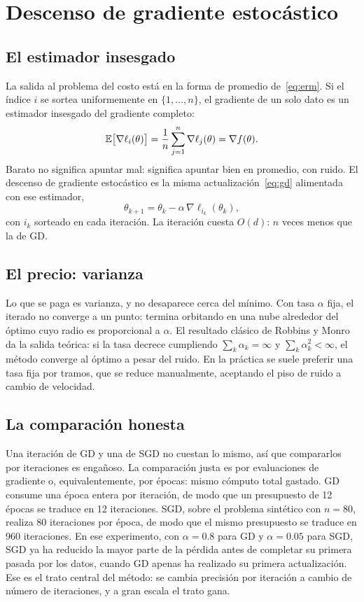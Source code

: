 \section{Descenso de gradiente estocástico}\label{sec:sgd}

\subsection{El estimador insesgado}

La salida al problema del costo está en la forma de promedio de~\eqref{eq:erm}. Si el índice $i$ se sortea uniformemente en $\{1, \dots, n\}$, el gradiente de un solo dato es un estimador insesgado del gradiente completo:
\begin{equation}
  \mathbb{E}\bigl[\nabla\ell_i(\theta)\bigr] = \frac{1}{n}\sum_{j=1}^{n} \nabla\ell_j(\theta) = \nabla f(\theta).
  \label{eq:insesgado}
\end{equation}
Barato no significa apuntar mal: significa apuntar bien en promedio, con ruido. El descenso de gradiente estocástico es la misma actualización~\eqref{eq:gd} alimentada con ese estimador,
\begin{equation}
  \theta_{k+1} = \theta_k - \alpha\,\nabla\ell_{i_k}(\theta_k),
  \label{eq:sgd}
\end{equation}
con $i_k$ sorteado en cada iteración. La iteración cuesta $O(d)$: $n$ veces menos que la de GD.

\subsection{El precio: varianza}

Lo que se paga es varianza, y no desaparece cerca del mínimo. Con tasa $\alpha$ fija, el iterado no converge a un punto: termina orbitando en una nube alrededor del óptimo cuyo radio es proporcional a $\alpha$. El resultado clásico de Robbins y Monro~\cite{robbins1951} da la salida teórica: si la tasa decrece cumpliendo $\sum_k \alpha_k = \infty$ y $\sum_k \alpha_k^2 < \infty$, el método converge al óptimo a pesar del ruido. En la práctica se suele preferir una tasa fija por tramos, que se reduce manualmente, aceptando el piso de ruido a cambio de velocidad.

\subsection{La comparación honesta}

Una iteración de GD y una de SGD no cuestan lo mismo, así que compararlos por iteraciones es engañoso. La comparación justa es por evaluaciones de gradiente o, equivalentemente, por épocas: mismo cómputo total gastado. GD consume una época entera por iteración, de modo que un presupuesto de 12 épocas se traduce en 12 iteraciones. SGD, sobre el problema sintético con $n = 80$, realiza 80 iteraciones por época, de modo que el mismo presupuesto se traduce en 960 iteraciones. En ese experimento, con $\alpha = 0.8$ para GD y $\alpha = 0.05$ para SGD, SGD ya ha reducido la mayor parte de la pérdida antes de completar su primera pasada por los datos, cuando GD apenas ha realizado su primera actualización. Ese es el trato central del método: se cambia precisión por iteración a cambio de número de iteraciones, y a gran escala el trato gana.
